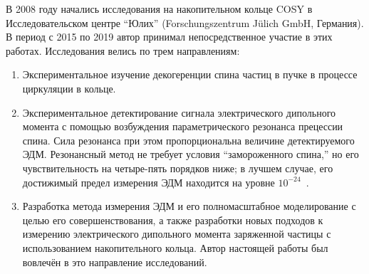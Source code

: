 В 2008 году начались исследования на накопительном кольце COSY в Исследовательском центре ``Юлих'' (Forschungszentrum J\"ulich GmbH, Германия). 
В период с 2015 по 2019 автор принимал непосредственное участие в этих работах. 
Исследования велись по трем направлениям:
\begin{enumerate}[(1)]
\item Экспериментальное изучение декогеренции спина частиц в пучке в процессе циркуляции в кольце. 

\item Экспериментальное детектирование сигнала электрического дипольного момента с помощью возбуждения параметрического резонанса прецессии спина. Сила резонанса при этом пропорциональна величине детектируемого ЭДМ. Резонансный метод не требует условия ``замороженного спина,'' но его чувствительность на четыре-пять порядков ниже; в лучшем случае, его достижимый предел измерения ЭДМ находится на уровне $10^{-24}$~\ecm. 

\item Разработка метода измерения ЭДМ и его полномасштабное моделирование с целью его совершенствования, а также  разработки новых подходов к измерению электрического дипольного момента заряженной частицы с использованием накопительного кольца. Автор настоящей работы был вовлечён в это направление исследований.
\end{enumerate}

%

